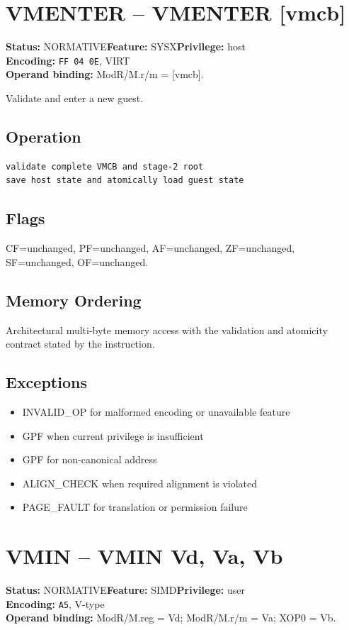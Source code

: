 \documentclass[10pt]{article}
\begin{document}
\section{VMENTER -- VMENTER [vmcb]}
\textbf{Status:} NORMATIVE\quad \textbf{Feature:} SYSX\quad \textbf{Privilege:} host\\
\textbf{Encoding:} \texttt{FF 04 0E}, VIRT\\
\textbf{Operand binding:} ModR/M.r/m = [vmcb].

Validate and enter a new guest.

\subsection*{Operation}
\begin{lstlisting}
validate complete VMCB and stage-2 root
save host state and atomically load guest state
\end{lstlisting}
\subsection*{Flags}
CF=unchanged, PF=unchanged, AF=unchanged, ZF=unchanged, SF=unchanged, OF=unchanged.
\subsection*{Memory Ordering}
Architectural multi-byte memory access with the validation and atomicity contract stated by the instruction.
\subsection*{Exceptions}
\begin{itemize}
\item INVALID\_OP for malformed encoding or unavailable feature
\item GPF when current privilege is insufficient
\item GPF for non-canonical address
\item ALIGN\_CHECK when required alignment is violated
\item PAGE\_FAULT for translation or permission failure
\end{itemize}
\clearpage

\section{VMIN -- VMIN Vd, Va, Vb}
\textbf{Status:} NORMATIVE\quad \textbf{Feature:} SIMD\quad \textbf{Privilege:} user\\
\textbf{Encoding:} \texttt{A5}, V-type\\
\textbf{Operand binding:} ModR/M.reg = Vd; ModR/M.r/m = Va; XOP0 = Vb.
\end{document}
